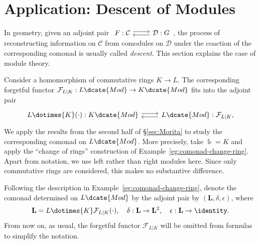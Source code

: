 
\section{Application: Descent of Modules}\label{sec:descent-modules}
\hypertarget{o014.aljabr2.chapter7.module-descent}{ }
In geometry, given an adjoint pair
$\begin{tikzcd}
	F: \mathcal{C} \arrow[shift left, r] & \mathcal{D}: G \arrow[shift left, l]
\end{tikzcd}$,
the process of reconstructing information on $\mathcal{C}$ from comodules on
$\mathcal{D}$ under the coaction of the corresponding comonad is usually
called \emph{descent}. This section explains the case of module theory.

Consider a homomorphism of commutative rings $K\to L$. The corresponding
forgetful functor $\mathcal{F}_{L|K}:L\dcate{Mod}\to K\dcate{Mod}$ fits into
the adjoint pair
\[\begin{tikzcd}
	L \dotimes{K} (\cdot): K\dcate{Mod} \arrow[shift left, r] & L\dcate{Mod} : \mathcal{F}_{L|K}, \arrow[shift left, l]
\end{tikzcd}\]
We apply the results from the second half of \S\ref{sec:Morita} to study the
corresponding comonad on $L\dcate{Mod}$. More precisely, take $\Bbbk=K$ and
apply the ``change of rings'' construction of
Example~\ref{eg:comonad-change-ring}. Apart from notation, we use left rather
than right modules here. Since only commutative rings are considered, this
makes no substantive difference.

Following the description in Example~\ref{eg:comonad-change-ring}, denote the
comonad determined on $L\dcate{Mod}$ by the adjoint pair by
$(\mathbf{L},\delta,\epsilon)$, where
\[ \mathbf{L} = L \dotimes{K} \mathcal{F}_{L|K}(\cdot), \quad \delta: \mathbf{L} \to \mathbf{L}^2, \quad \epsilon: \mathbf{L} \to \identity. \]
From now on, as usual, the forgetful functor $\mathcal{F}_{L|K}$ will be
omitted from formulas to simplify the notation.

